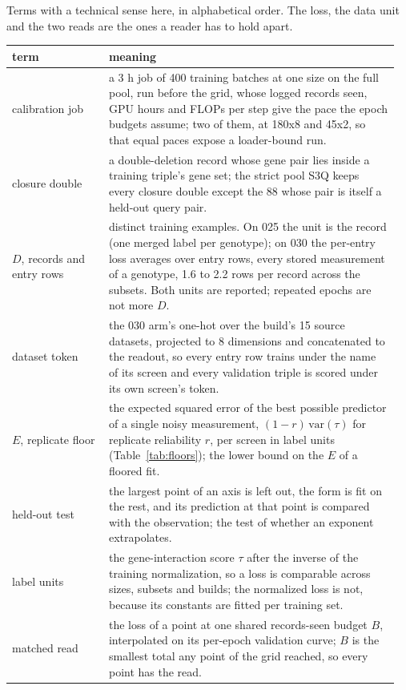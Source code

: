Terms with a technical sense here, in alphabetical order. The loss, the data unit
and the two reads are the ones a reader has to hold apart.

\begin{table}[H]
\centering\footnotesize
\begin{tabular}{p{0.24\linewidth}p{0.72\linewidth}}
\toprule
term & meaning \\
\midrule
calibration job & a 3 h job of 400 training batches at one size on the full pool, run before the grid, whose logged records seen, GPU hours and FLOPs per step give the pace the epoch budgets assume; two of them, at 180x8 and 45x2, so that equal paces expose a loader-bound run. \\
closure double & a double-deletion record whose gene pair lies inside a training triple's gene set; the strict pool S3Q keeps every closure double except the 88 whose pair is itself a held-out query pair. \\
$D$, records and entry rows & distinct training examples. On 025 the unit is the record (one merged label per genotype); on 030 the per-entry loss averages over entry rows, every stored measurement of a genotype, 1.6 to 2.2 rows per record across the subsets. Both units are reported; repeated epochs are not more $D$. \\
dataset token & the 030 arm's one-hot over the build's 15 source datasets, projected to 8 dimensions and concatenated to the readout, so every entry row trains under the name of its screen and every validation triple is scored under its own screen's token. \\
$E$, replicate floor & the expected squared error of the best possible predictor of a single noisy measurement, $(1 - r)\,\mathrm{var}(\tau)$ for replicate reliability $r$, per screen in label units (Table~\ref{tab:floors}); the lower bound on the $E$ of a floored fit. \\
held-out test & the largest point of an axis is left out, the form is fit on the rest, and its prediction at that point is compared with the observation; the test of whether an exponent extrapolates. \\
label units & the gene-interaction score $\tau$ after the inverse of the training normalization, so a loss is comparable across sizes, subsets and builds; the normalized loss is not, because its constants are fitted per training set. \\
matched read & the loss of a point at one shared records-seen budget $B$, interpolated on its per-epoch validation curve; $B$ is the smallest total any point of the grid reached, so every point has the read. \\

\end{tabular}
\end{table}
